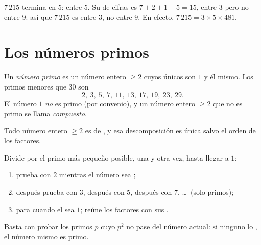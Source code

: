 \begin{example}
$7\,215$ termina en $5$:  entre $5$. Su  de cifras es
$7 + 2 + 1 + 5 = 15$,  entre $3$ pero no entre $9$: así que $7\,215$ es
 entre $3$, no entre $9$. En efecto, $7\,215 = 3 \times 5 \times 481$.
\end{example}

\section{Los números primos}

\begin{definition}\label{def:g9:arith:prime}
Un \emph{número primo} es un número entero $\geq 2$ cuyos
únicos  son $1$ y él mismo. Los primos menores que $30$ son
\[
2,\ 3,\ 5,\ 7,\ 11,\ 13,\ 17,\ 19,\ 23,\ 29 .
\]
El número $1$ \emph{no} es primo (por convenio), y un número entero
$\geq 2$ que no es primo se llama \emph{compuesto}.
\end{definition}

\begin{theorem}\label{thm:g9:arith:factorization}
Todo número entero $\geq 2$ es  de , y esa
descomposición es única salvo el orden de los factores.
\end{theorem}
\admitted

\begin{method}\label{met:g9:arith:factorization}
Divide por el primo más pequeño posible, una y otra vez, hasta llegar a $1$:
\begin{enumerate}
  \item prueba con $2$ mientras el número sea ;
  \item después prueba con $3$, después con $5$, después con $7$, \dots\ (solo primos);
  \item para cuando el  sea $1$; reúne los factores con sus
        .
\end{enumerate}
Basta con probar los primos $p$ cuyo $p^2$ no pase del número
actual: si ninguno lo , el número mismo es primo.
\end{method}

